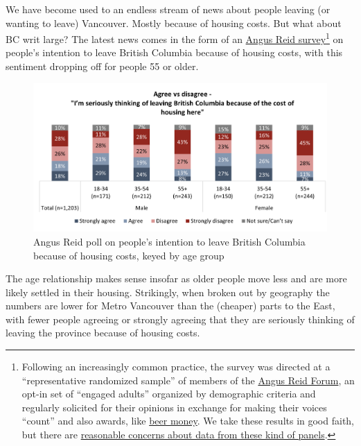 \documentclass[
  letterpaper,
]{article}
\begin{document}
We have become used to an endless stream of news about people leaving
(or wanting to leave) Vancouver. Mostly because of housing costs. But
what about BC writ large? The latest news comes in the form of an
\href{https://angusreid.org/bc-investment-migration-housing/}{Angus Reid
survey}\footnote{Following an increasingly common practice, the survey
  was directed at a ``representative randomized sample'' of members of
  the \href{https://www.angusreidforum.com/en-ca/FAQ}{Angus Reid Forum},
  an opt-in set of ``engaged adults'' organized by demographic criteria
  and regularly solicited for their opinions in exchange for making
  their voices ``count'' and also awards, like
  \href{https://www.reddit.com/r/beermoney/comments/l66jqp/canadians_anyone_use_angus_reid_forum/}{beer
  money}. We take these results in good faith, but there are
  \href{https://www.pewresearch.org/short-reads/2024/03/05/online-opt-in-polls-can-produce-misleading-results-especially-for-young-people-and-hispanic-adults/}{reasonable
  concerns about data from these kind of panels}.} on people's intention
to leave British Columbia because of housing costs, with this sentiment
dropping off for people 55 or older.

\begin{figure}[H]

{\centering \includegraphics{images/angus-reid-leaving-bc.png}

}

\caption{Angus Reid poll on people's intention to leave British Columbia
because of housing costs, keyed by age group}

\end{figure}%

The age relationship makes sense insofar as older people move less and
are more likely settled in their housing. Strikingly, when broken out by
geography the numbers are lower for Metro Vancouver than the (cheaper)
parts to the East, with fewer people agreeing or strongly agreeing that
they are seriously thinking of leaving the province because of housing
costs.
\end{document}
